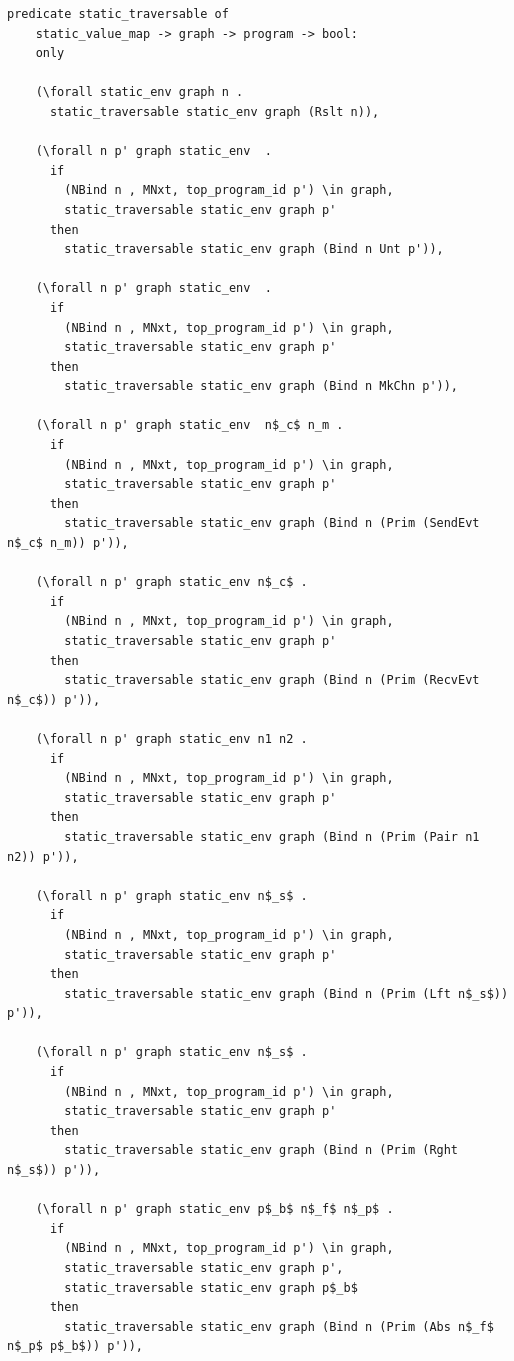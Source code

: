 \documentclass[10pt]{article}
\begin{document}
\begin{lstlisting}[language=logic, mathescape]
  predicate static_traversable of
    static_value_map -> graph -> program -> bool:
    only

    (\forall static_env graph n .
      static_traversable static_env graph (Rslt n)),

    (\forall n p' graph static_env  .
      if
        (NBind n , MNxt, top_program_id p') \in graph,
        static_traversable static_env graph p'
      then
        static_traversable static_env graph (Bind n Unt p')),

    (\forall n p' graph static_env  .
      if
        (NBind n , MNxt, top_program_id p') \in graph,
        static_traversable static_env graph p'
      then
        static_traversable static_env graph (Bind n MkChn p')),

    (\forall n p' graph static_env  n$_c$ n_m .
      if
        (NBind n , MNxt, top_program_id p') \in graph, 
        static_traversable static_env graph p'
      then
        static_traversable static_env graph (Bind n (Prim (SendEvt n$_c$ n_m)) p')),

    (\forall n p' graph static_env n$_c$ .
      if
        (NBind n , MNxt, top_program_id p') \in graph,
        static_traversable static_env graph p'
      then
        static_traversable static_env graph (Bind n (Prim (RecvEvt n$_c$)) p')),

    (\forall n p' graph static_env n1 n2 .
      if
        (NBind n , MNxt, top_program_id p') \in graph,
        static_traversable static_env graph p'
      then
        static_traversable static_env graph (Bind n (Prim (Pair n1 n2)) p')),

    (\forall n p' graph static_env n$_s$ .
      if
        (NBind n , MNxt, top_program_id p') \in graph,
        static_traversable static_env graph p'
      then
        static_traversable static_env graph (Bind n (Prim (Lft n$_s$)) p')),

    (\forall n p' graph static_env n$_s$ .
      if
        (NBind n , MNxt, top_program_id p') \in graph,
        static_traversable static_env graph p'
      then
        static_traversable static_env graph (Bind n (Prim (Rght n$_s$)) p')),

    (\forall n p' graph static_env p$_b$ n$_f$ n$_p$ .
      if
        (NBind n , MNxt, top_program_id p') \in graph,
        static_traversable static_env graph p', 
        static_traversable static_env graph p$_b$
      then
        static_traversable static_env graph (Bind n (Prim (Abs n$_f$ n$_p$ p$_b$)) p')),


\end{lstlisting}
\end{document}
